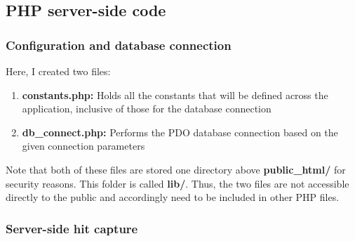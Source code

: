 \documentclass[12pt]{article}
\begin{document}
\subsection{PHP server-side code}
\subsubsection{Configuration and database connection}
Here, I created two files:
\begin{enumerate}
\item{\textbf{constants.php:}} Holds all the constants that will be defined across the application, inclusive of those for the database connection
\item{\textbf{db\_connect.php:}} Performs the PDO database connection based on the given connection parameters
\end{enumerate}
Note that both of these files are stored one directory above \textbf{public\_html/} for security reasons. This folder is called \textbf{lib/}. Thus, the two files are not accessible directly to the public and accordingly need to be included in other PHP files.

\subsubsection{Server-side hit capture}


\vfill
\end{document}
